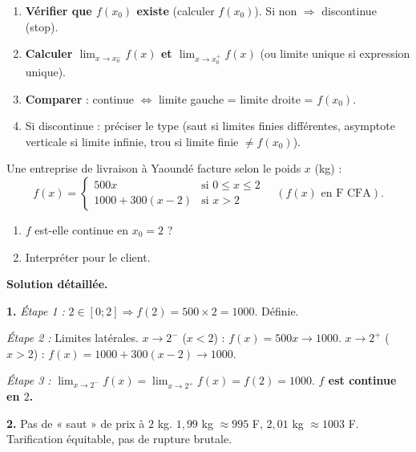 \documentclass[11pt]{article}
\begin{document}
\begin{methode}
\begin{enumerate}
\item \textbf{Vérifier que $f(x_0)$ existe} (calculer $f(x_0)$). Si non $\Rightarrow$ discontinue (stop).
\item \textbf{Calculer $\lim_{x\to x_0^-} f(x)$ et $\lim_{x\to x_0^+} f(x)$} (ou limite unique si expression unique).
\item \textbf{Comparer} : continue $\iff$ limite gauche = limite droite = $f(x_0)$.
\item Si discontinue : préciser le type (saut si limites finies différentes, asymptote verticale si limite infinie, trou si limite finie $\neq f(x_0)$).
\end{enumerate}
\end{methode}

\begin{exoresolu}
Une entreprise de livraison à Yaoundé facture selon le poids $x$ (kg) :
\[f(x)=\begin{cases} 500x & \text{si } 0\leq x\leq 2 \\ 1000+300(x-2) & \text{si } x>2 \end{cases}\quad (f(x) \text{ en F CFA}).\]
\begin{enumerate}
\item $f$ est-elle continue en $x_0=2$ ?
\item Interpréter pour le client.
\end{enumerate}
\tcblower
\textbf{Solution détaillée.}

\textbf{1.} \emph{Étape 1 :} $2\in[0;2] \Rightarrow f(2)=500\times 2=1000$. Définie.

\emph{Étape 2 :} Limites latérales.
$x\to 2^-$ ($x<2$) : $f(x)=500x \to 1000$.
$x\to 2^+$ ($x>2$) : $f(x)=1000+300(x-2) \to 1000$.

\emph{Étape 3 :} $\lim_{x\to 2^-}f(x)=\lim_{x\to 2^+}f(x)=f(2)=1000$.
\textbf{$f$ est continue en $2$.}

\textbf{2.} Pas de « saut » de prix à $2$ kg. $1{,}99$ kg $\approx 995$ F, $2{,}01$ kg $\approx 1003$ F. Tarification équitable, pas de rupture brutale.
\end{exoresolu}
\end{document}
